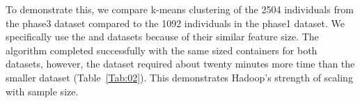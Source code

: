\documentclass{bioinfo}
\begin{document}
To demonstrate this, we compare k-means clustering of the 2504 individuals from the phase3 dataset compared to the 1092 individuals in the phase1 dataset.
We specifically use the \SevenPhaseone{} and \ThreePhasethree{} datasets because of their similar feature size.
The algorithm completed successfully with the same sized containers for both datasets, however, the \ThreePhasethree{} dataset required about twenty minutes more time than the smaller \SevenPhaseone{} dataset (Table~\ref{Tab:02}). 
This demonstrates Hadoop's strength of scaling with sample size. 




\end{document}
